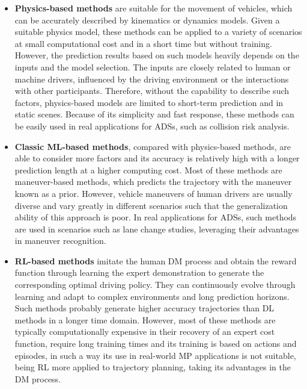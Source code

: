\begin{itemize}
	
	\item \textbf{Physics-based methods} are suitable for the movement of vehicles, which can be accurately described by kinematics or dynamics models. Given a suitable physics model, these methods can be applied to a variety of scenarios at small computational cost and in a short time but without training. However, the prediction results based on such models heavily depends on the inputs and the model selection. The inputs are closely related to human or machine drivers, influenced by the driving environment or the interactions with other participants. Therefore, without the capability to describe such factors, physics-based models are limited to short-term prediction and in static scenes. Because of its simplicity and fast response, these methods can be easily used in real applications for \acp{ADS}, such as collision risk analysis.
	
	\item \textbf{Classic \ac{ML}-based methods}, compared with physics-based methods, are able to consider more factors and its accuracy is relatively high with a longer prediction length at a higher computing cost. Most of these methods are maneuver-based methods, which predicts the trajectory with the maneuver known as a prior. However, vehicle maneuvers of human drivers are usually diverse and vary greatly in different scenarios such that the generalization ability of this approach is poor. In real applications for \acp{ADS}, such methods are used in scenarios such as lane change studies, leveraging their advantages in maneuver recognition.
	
	\item \textbf{\ac{RL}-based methods} imitate the human \ac{DM} process and obtain the reward function through learning the expert demonstration to generate the corresponding optimal driving policy. They can continuously evolve through learning and adapt to complex environments and long prediction horizons. Such methods probably generate higher accuracy trajectories than \ac{DL} methods in a longer time domain. However, most of these methods are typically computationally expensive in their recovery of an expert cost function, require long training times and its training is based on actions and episodes, in such a way its use in real-world \ac{MP} applications is not suitable, being \ac{RL} more applied to trajectory planning, taking its advantages in the \ac{DM} process.
	

\end{itemize}
